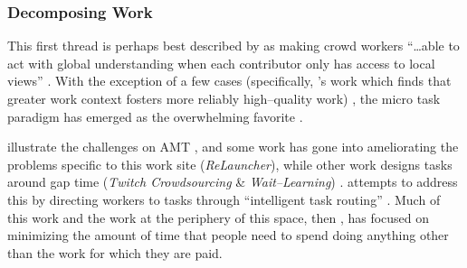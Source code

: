 \documentclass[trackingWork]{subfiles}
\begin{document}
\subsubsection[How far can work be decomposed into smaller and smaller microtasks]{Decomposing Work}\label{sec:decomposition}

\subsubsubsection{\crowdworkpers}
This first thread is
perhaps best described by \citeauthor{verroios2014context} as
making crowd workers ``\dots able to act with
global understanding when each contributor only has access to local views''
\cite{verroios2014context}.
With the exception of a few cases
(specifically, \citeauthor{Kinnaird:2012:WTM:2389176.2389219}'s work
which finds that greater work context fosters more reliably high--quality work)%
, the micro task paradigm has emerged as the overwhelming favorite
\cite{selfsourcingTeevan2014,selfsourcingTeevan2016%
,       cheng2015break,Kinnaird:2012:WTM:2389176.2389219}.


\citeauthor{taskSearch} illustrate the challenges on AMT%
, and some work has gone into ameliorating the problems specific to this work site
(\textit{ReLauncher}), %
while other work designs tasks around gap time
(\textit{Twitch Crowdsourcing} \& \textit{Wait--Learning})
\cite{taskSearch,KucherbaevReLauncher,Vaish:2014:TCC:2611222.2556996%
,       Cai:2015:WLW:2702123.2702267}.
\citeauthor{Cosley:2007:SUI:1216295.1216309}
attempts to address this by
directing workers to tasks through
``intelligent task routing''
\cite{Cosley:2007:SUI:1216295.1216309}.
Much of this work and the work at the periphery of this space, then%
, has focused on
minimizing the amount of time that people need to spend doing
anything other than the work for which they are paid.
\end{document}
